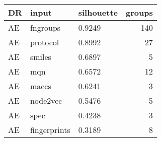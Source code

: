\begin{tabular}{lllr}
\toprule
    DR &         input & silhouette &  groups \\
\midrule
    AE &      fngroups &     0.9249 &     140 \\
    AE &      protocol &     0.8992 &      27 \\
    AE &        smiles &     0.6897 &       5 \\
    AE &           mqn &     0.6572 &      12 \\
    AE &         maccs &     0.6241 &       3 \\
    AE &      node2vec &     0.5476 &       5 \\
    AE &          spec &     0.4238 &       3 \\
    AE &  fingerprints &     0.3189 &       8 \\
\bottomrule
\end{tabular}